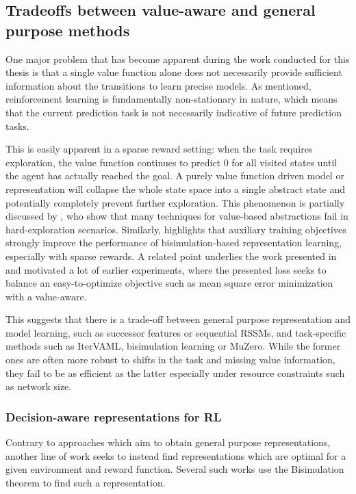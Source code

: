 \subsection{Tradeoffs between value-aware and general purpose methods}

One major problem that has become apparent during the work conducted for this thesis is that a single value function alone does not necessarily provide sufficient information about the transitions to learn precise models.
As mentioned, reinforcement learning is fundamentally non-stationary in nature, which means that the current prediction task is not necessarily indicative of future prediction tasks.

This is easily apparent in a sparse reward setting: when the task requires exploration, the value function continues to predict 0 for all visited states until the agent has actually reached the goal.
A purely value function driven model or representation will collapse the whole state space into a single abstract state and potentially completely prevent further exploration.
This phenomenon is partially discussed by \textcite{tomar2021learning}, who show that many techniques for value-based abstractions fail in hard-exploration scenarios.
Similarly, \textcite{kemertas2021towards} highlights that auxiliary training objectives strongly improve the performance of bisimulation-based representation learning, especially with sparse rewards.
A related point underlies the work presented in \textcite{vagram} and motivated a lot of earlier experiments, where the presented loss seeks to balance an easy-to-optimize objective such as mean square error minimization with a value-aware.

This suggests that there is a trade-off between general purpose representation and model learning, such as successor features or sequential RSSMs, and task-specific methods such as IterVAML, bisimulation learning or MuZero.
While the former ones are often more robust to shifts in the task and missing value information, they fail to be as efficient as the latter especially under resource constraints such as network size.


\subsubsection{Decision-aware representations for RL}

Contrary to approaches which aim to obtain general purpose representations, another line of work seeks to instead find representations which are optimal for a given environment and reward function.
Several such works use the Bisimulation theorem \parencite{ferns2004metrics} to find such a representation.

